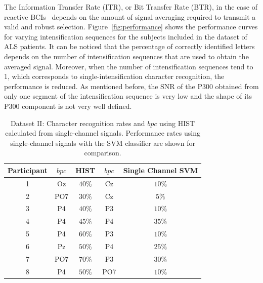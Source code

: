 

The Information Transfer Rate (ITR), or Bit Transfer Rate (BTR), in the case of reactive BCIs~\cite{WolpawJonathanR2012}  depends on the amount of signal averaging required to transmit a valid and robust selection.  Figure~\ref{fig:performance} shows the performance curves for varying intensification sequences for the subjects included in the dataset of ALS patients. It can be noticed that the percentage of correctly identified letters depends on the number of intensification sequences that are used to obtain the averaged signal.  Moreover, when the number of intensification sequences tend to 1, which corresponds to single-intensification character recognition, the performance is reduced. As mentioned before, the SNR of the P300 obtained from only one segment of the intensification sequence is very low and the shape of its P300 component is not very well defined.

\begin{table}[h!]
\caption[Dataset II - Single Channel Character Recognition Rates]{Dataset II: Character recognition rates and $bpc$  using HIST calculated from  single-channel signals.  Performance rates using single-channel signals with the SVM classifier are shown for comparison.}
\centering
\begin{tabular}{c|cc|cc}
\toprule
\textbf{Participant}	&  $bpc$	&  HIST &  $bpc$	&  Single Channel SVM \\
\midrule
1     &     Oz   &   $40\%$  &  Cz   &  $10\%$    \\
2     &     PO7   &   $30\%$      &  Cz   & $5\%$   \\
3     &     P4   &   $40\%$    &  P3   & $10\%$    \\
4     &     P4 &   $45\%$    &  P4   & $35\%$     \\
5     &     P4 &   $60\%$  &  P3   & $10\%$     \\
6     &     Pz &   $50\%$ &  P4   & $25\%$     \\
7     &     PO7 &   $70\%$  &  P3   & $30\%$     \\
8     &     P4 &   $50\%$    &  PO7   & $10\%$    \\

\end{tabular}
\label{tab:resultsown}
\end{table}


